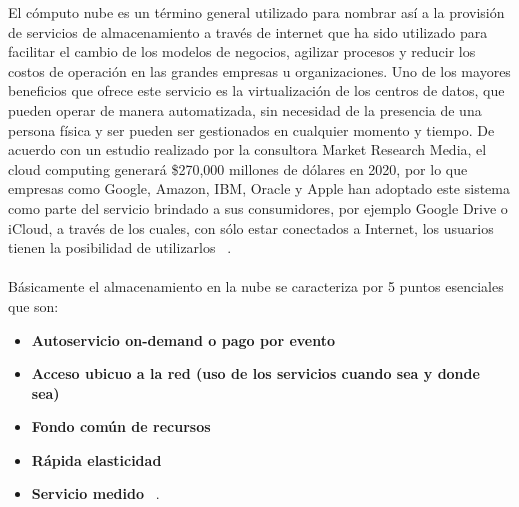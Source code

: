 El cómputo nube es un término general utilizado para nombrar así a la provisión de servicios de almacenamiento a través de internet que ha sido utilizado para facilitar el cambio de los modelos de negocios, agilizar procesos y reducir los costos de operación en las grandes empresas u organizaciones. Uno de los mayores beneficios que ofrece este servicio es la virtualización de los centros de datos, que pueden operar de manera automatizada, sin  necesidad de la presencia de una persona física y ser pueden ser gestionados en cualquier momento y tiempo. De acuerdo con un estudio realizado por la consultora Market Research Media, el cloud computing generará \$270,000 millones de dólares en 2020, por lo que empresas como Google, Amazon, IBM, Oracle y Apple han adoptado este sistema como parte del servicio brindado a sus consumidores, por ejemplo Google Drive o iCloud, a través de los cuales, con sólo estar conectados a Internet, los usuarios tienen la posibilidad de utilizarlos ~\cite{Nubecomp}. \\ \\ Básicamente el almacenamiento en la nube se caracteriza por 5 puntos esenciales que son: 
	\begin{itemize}
		\item \textbf{Autoservicio on-demand o pago por evento}  
		\item \textbf{Acceso ubicuo a la red (uso de los servicios cuando sea y donde sea)}  
		\item \textbf{Fondo común de recursos} 
		\item \textbf{Rápida elasticidad} 
 		\item \textbf{Servicio medido}  ~\cite{Compnube}.
 \end{itemize}

